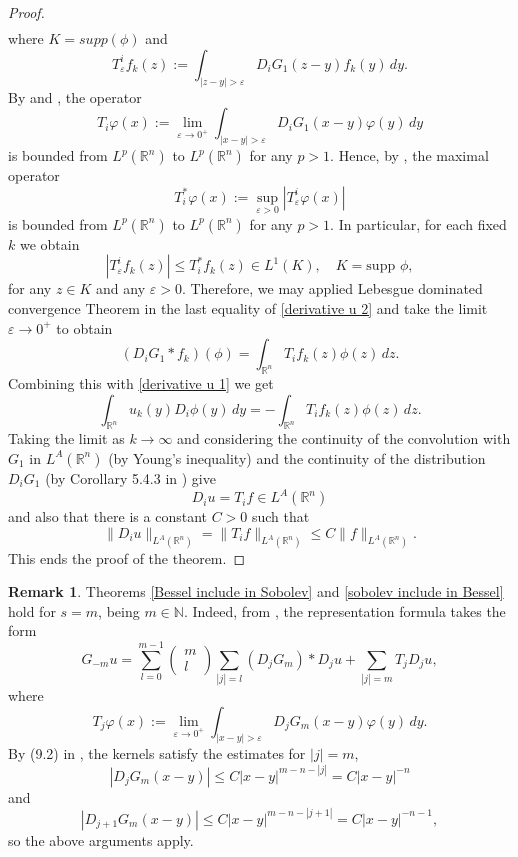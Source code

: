 \documentclass[leqno,twoside, 12pt]{amsart}
\theoremstyle{plain}
\numberwithin{equation}{section} \numberwithin{figure}{section}
\theoremstyle{definition}
\newtheorem{remark}[theorem]{Remark}
\newcommand{\R}{\mathbb R}
\numberwithin{equation}{section}
\begin{document}
\begin{proof}
\begin{equation}
\begin{split}
\end{split}
\end{equation}where $K=supp(\phi)$ and
$$T^i_{\varepsilon}f_k(z):= \int_{|z-y|>\varepsilon}D_iG_1(z-y)f_k(y)\,dy.$$By \cite[Theorem 5.1]{D} and \cite[Eq. (5.7)]{AS}, the operator
$$T_i\varphi(x):=\lim_{\varepsilon\to 0^+}\int_{|x-y|>\varepsilon}D_iG_1(x-y)\varphi(y)\,dy$$is bounded from $L^p(\R^n)$ to $L^p(\R^n)$ for any $p>1.$ Hence, by \cite[Theorem 5.14]{D}, the maximal operator
$$T_i^{*}\varphi(x):=\sup_{\varepsilon>0}|T^i_\varepsilon \varphi(x)|$$is bounded from $L^p(\R^n)$ to $L^p(\R^n)$ for any $p>1$. In particular, for each fixed $k$ we obtain
$$|T^i_{\varepsilon}f_k(z)| \leq T_i^{*}f_k(z) \in L^1(K), \quad K=\text{supp }\phi,$$for any $z\in K$ and any $\varepsilon>0$. Therefore, we may applied Lebesgue dominated convergence Theorem in the last equality of \eqref{derivative u 2} and take the limit $\varepsilon\to 0^+$ to obtain
\begin{equation*}
(D_iG_1*f_k)(\phi)=\int_{\mathbb{R}^n}T_if_k(z)\phi(z)\,dz.
\end{equation*}Combining this with \eqref{derivative u 1} we get
\begin{equation}
\int_{\mathbb{R}^n}u_k(y)D_i\phi(y)\,dy=-\int_{\mathbb{R}^n}T_if_k(z)\phi(z)\,dz.
\end{equation}Taking the limit as $k\to \infty$ and considering the continuity of the convolution with $G_1$ in $L^A(\mathbb{R}^n)$ (by Young's inequality) and the continuity of the distribution $D_iG_1$ (by Corollary 5.4.3 in \cite{HH}) give
$$D_iu=T_if \in L^A(\mathbb{R}^n)$$and also that there is a constant $C>0$ such that 
$$\|D_iu\|_{L^A(\mathbb{R}^n)}=\|T_if\|_{L^A(\mathbb{R}^n)}\leq C\|f\|_{L^A(\mathbb{R}^n)}.$$This ends the proof of the theorem.
\end{proof}

\begin{remark}
Theorems \ref{Bessel include in Sobolev} and \ref{sobolev include in Bessel} hold for $s=m$, being $m\in \mathbb{N}.$ Indeed, from \cite[Eq. (5.30)]{AS}, the representation formula takes the form
$$G_{-m}u=\sum_{l=0}^{m-1}\begin{pmatrix}
m \\ 
l
\end{pmatrix}\sum_{|j|=l}(D_jG_m)*D_ju + \sum_{|j|=m}T_jD_ju,$$where
$$T_j\varphi(x):=\lim_{\varepsilon\to 0^+}\int_{|x-y|>\varepsilon}D_jG_m(x-y)\varphi(y)\,dy.$$By (9.2) in \cite{AS}, the kernels satisfy the estimates for $|j|=m$,
$$|D_jG_m(x-y)|\leq C|x-y|^{m-n-|j|}=C|x-y|^{-n}$$and  $$|D_{j+1}G_m(x-y)|\leq C|x-y|^{m-n-|j+1|}=C|x-y|^{-n-1},$$so the above arguments apply. 
\end{remark}
\end{document}
